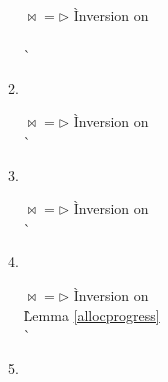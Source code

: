 \begin{enumerate}
\begin{enumerate}
    \begin{tabbing}
    $\bowtie{} = \rhd$
      \` Inversion on  \\
     \\
      \`  \\
    \end{tabbing}

  \item {} \ \\

    \begin{tabbing}
    $\bowtie{} = \rhd$
      \` Inversion on  \\
      \`  \\
    \end{tabbing}

  \item {} \ \\

    \begin{tabbing}
    $\bowtie{} = \rhd$
     \` Inversion on  \\
      \`  \\
    \end{tabbing}

  \item {} \ \\

    \begin{tabbing}
    $\bowtie{} = \rhd$
     \` Inversion on  \\
      \` Lemma \ref{allocprogress} \\
      \`  \\
    \end{tabbing}

  \item {} \ \\


\end{enumerate}
\end{enumerate}
